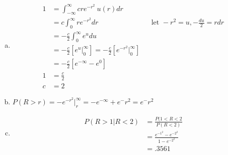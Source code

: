 \documentclass[12pt]{article}
\newenvironment{problem}[2][Problem]{\begin{trivlist}
\item[\hskip \labelsep {\bfseries #1}\hskip \labelsep {\bfseries #2.}]
  \vspace{1 cm}
}{\end{trivlist}}
\begin{document}
\begin{problem}{3.31}
\item
  \begin{enumerate}[a.]
    \item %
      \begin{align*}
        1 &= \int_{-\infty}^\infty cre^{-r^2} \ u(r)dr \\
        &= c\int_{0}^\infty re^{-r^2} dr & & \textrm{let } -r^2 = u, -\frac{du}{2} = rdr \\
        &= -\frac{c}{2}\int_{0}^\infty e^{u} du \\
        &= -\frac{c}{2}\left[ e^{u}\big|_0^\infty \right] 
          = -\frac{c}{2}\left[ e^{-r^2}\big|_0^\infty \right] \\
        &= -\frac{c}{2}\left[ e^{-\infty} - e^0 \right] \\
       1 &= \frac{c}{2} \\
       c &= 2
      \end{align*}
    \item %
      $P(R>r) = -e^{-r^2}\big|_r^\infty = -e^{-\infty} + e^-r^2 = e^-r^2$
    \item %
      \begin{align*}
        P(R>1|R<2) &= \frac{P(1<R<2}{P(R<2)} \\
        &= \frac{e^{-1^2}-e^{-2^2}}{1-e^{-2^2}} \\
        &= .3561 
      \end{align*}
    \end{enumerate}
\end{problem}
\end{document}
